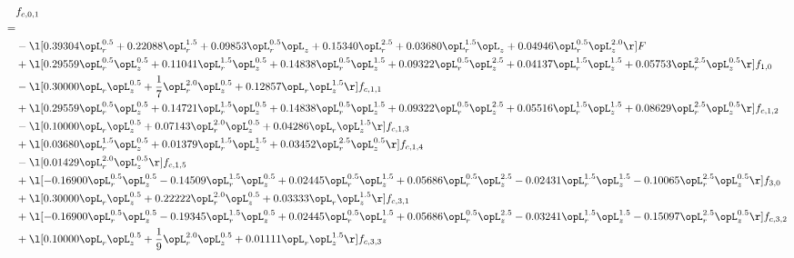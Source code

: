 \begin{alignat}{2} 
\label{eq:f_01_1} 
& f_{c,0,1} \nonumber \\ 
 = \\ 
& - \l[  0.39304 \opL_r^{0.5} +  0.22088 \opL_r^{1.5} +  0.09853 \opL_r^{0.5} \opL_z +  0.15340 \opL_r^{2.5} +  0.03680 \opL_r^{1.5} \opL_z +  0.04946 \opL_r^{0.5} \opL_z^{2.0}  \r] F \nonumber \\ 
& + \l[  0.29559 \opL_r^{0.5} \opL_z^{0.5} +  0.11041 \opL_r^{1.5} \opL_z^{0.5} +  0.14838 \opL_r^{0.5} \opL_z^{1.5} +  0.09322 \opL_r^{0.5} \opL_z^{2.5} +  0.04137 \opL_r^{1.5} \opL_z^{1.5} +  0.05753 \opL_r^{2.5} \opL_z^{0.5}  \r] f_{1,0} \nonumber \\ 
& - \l[  0.30000 \opL_r \opL_z^{0.5} + \frac{1}{7} \opL_r^{2.0} \opL_z^{0.5} +  0.12857 \opL_r \opL_z^{1.5}  \r] f_{c,1,1} \nonumber \\ 
& + \l[  0.29559 \opL_r^{0.5} \opL_z^{0.5} +  0.14721 \opL_r^{1.5} \opL_z^{0.5} +  0.14838 \opL_r^{0.5} \opL_z^{1.5} +  0.09322 \opL_r^{0.5} \opL_z^{2.5} +  0.05516 \opL_r^{1.5} \opL_z^{1.5} +  0.08629 \opL_r^{2.5} \opL_z^{0.5}  \r] f_{c,1,2} \nonumber \\ 
& - \l[  0.10000 \opL_r \opL_z^{0.5} +  0.07143 \opL_r^{2.0} \opL_z^{0.5} +  0.04286 \opL_r \opL_z^{1.5}  \r] f_{c,1,3} \nonumber \\ 
& + \l[  0.03680 \opL_r^{1.5} \opL_z^{0.5} +  0.01379 \opL_r^{1.5} \opL_z^{1.5} +  0.03452 \opL_r^{2.5} \opL_z^{0.5}  \r] f_{c,1,4} \nonumber \\ 
& - \l[  0.01429 \opL_r^{2.0} \opL_z^{0.5}  \r] f_{c,1,5} \nonumber \\ 
& + \l[  -0.16900 \opL_r^{0.5} \opL_z^{0.5}   -0.14509 \opL_r^{1.5} \opL_z^{0.5} +  0.02445 \opL_r^{0.5} \opL_z^{1.5} +  0.05686 \opL_r^{0.5} \opL_z^{2.5}   -0.02431 \opL_r^{1.5} \opL_z^{1.5}   -0.10065 \opL_r^{2.5} \opL_z^{0.5}  \r] f_{3,0} \nonumber \\ 
& + \l[  0.30000 \opL_r \opL_z^{0.5} +  0.22222 \opL_r^{2.0} \opL_z^{0.5} +  0.03333 \opL_r \opL_z^{1.5}  \r] f_{c,3,1} \nonumber \\ 
& + \l[  -0.16900 \opL_r^{0.5} \opL_z^{0.5}   -0.19345 \opL_r^{1.5} \opL_z^{0.5} +  0.02445 \opL_r^{0.5} \opL_z^{1.5} +  0.05686 \opL_r^{0.5} \opL_z^{2.5}   -0.03241 \opL_r^{1.5} \opL_z^{1.5}   -0.15097 \opL_r^{2.5} \opL_z^{0.5}  \r] f_{c,3,2} \nonumber \\ 
& + \l[  0.10000 \opL_r \opL_z^{0.5} + \frac{1}{9} \opL_r^{2.0} \opL_z^{0.5} +  0.01111 \opL_r \opL_z^{1.5}  \r] f_{c,3,3} \nonumber \\ 

\end{alignat}
